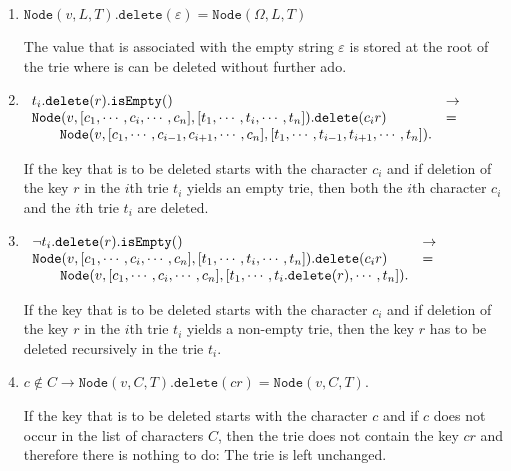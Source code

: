 \begin{enumerate}
\item $\texttt{Node}(v,L,T).\texttt{delete}(\varepsilon) = \texttt{Node}(\Omega,L,T)$

      The value that is associated with the empty  string $\varepsilon$ is stored at the root of the
      trie where is can be deleted without further ado.
\item $\begin{array}[t]{ll}
       t_i.\texttt{delete}(r).\texttt{isEmpty}()   & \rightarrow \\
       \texttt{Node}(v, [c_1,\cdots,c_i,\cdots,c_n],[t_1,\cdots,t_i,\cdots,t_n]).\texttt{delete}(c_ir) 
       & = \\
       \qquad 
       \texttt{Node}(v, [c_1,\cdots,c_{i-1},c_{i+1},\cdots,c_n],[t_1,\cdots,t_{i-1},t_{i+1},\cdots,t_n]).
       \end{array}
       $

       If  the key that is to be deleted starts with the character $c_i$ and if deletion of  the key
       $r$ in the $i$th  trie $t_i$ yields an empty
       trie, then both the $i$th character $c_i$ and the $i$th trie $t_i$ are deleted.
\item $\begin{array}[t]{ll}
       \neg t_i.\texttt{delete}(r).\texttt{isEmpty}()   & \rightarrow \\
       \texttt{Node}(v, [c_1,\cdots,c_i,\cdots,c_n],[t_1,\cdots,t_i,\cdots,t_n]).\texttt{delete}(c_ir) 
       & = \\
       \qquad \texttt{Node}(v, [c_1,\cdots,c_i,\cdots,c_n],[t_1,\cdots,t_i.\texttt{delete}(r),\cdots,t_n]).
       \end{array}
       $

       If  the key that is to be deleted starts with the character $c_i$ and if deletion of  the key
       $r$ in the $i$th  trie $t_i$ yields a non-empty trie, then the key $r$ has to be deleted recursively
       in the trie $t_i$.
\item $c \notin C \rightarrow \texttt{Node}(v, C, T).\texttt{delete}(cr) =
       \texttt{Node}(v, C, T)$. 
       
       If  the key that is to be deleted starts with the character $c$ and if $c$ does not occur in
       the list of characters $C$, then the trie does not contain the key $cr$ and therefore there
       is nothing  to do:  The trie is left unchanged.
\end{enumerate}


